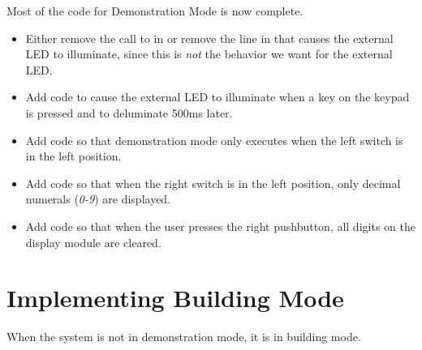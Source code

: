 Most of the code for Demonstration Mode is now complete.

    \begin{itemize}
    \item Either remove the call to  in
         or remove the line in  that
        causes the external LED to illuminate, since this is \textit{not} the
        behavior we want for the external LED.
    \item Add code to cause the external LED to illuminate when a key on the
        keypad is pressed and to deluminate 500ms later.
    \item Add code so that demonstration mode only executes when the left
        switch is in the left position.
    \item Add code so that when the right switch is in the left position, only
        decimal numerals (\textit{0-9}) are displayed.
    \item Add code so that when the user presses the right pushbutton, all
        digits on the display module are cleared.
    \end{itemize}

\section{Implementing Building Mode} \label{sec:BuildingMode}

When the system is not in demonstration mode, it is in building mode.

